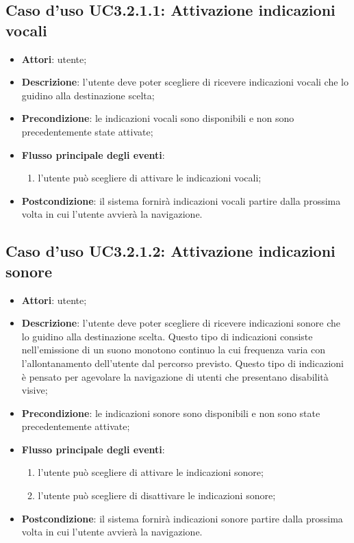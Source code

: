 \documentclass[../AnalisiDeiRequisiti.tex]{subfiles}
\begin{document}
\subsection{Caso d'uso UC3.2.1.1: Attivazione indicazioni vocali}
\begin{itemize}
\item \textbf{Attori}: utente;
\item \textbf{Descrizione}: l'utente deve poter scegliere di ricevere indicazioni vocali che lo guidino alla destinazione scelta; 
      \item \textbf{Precondizione}: le indicazioni vocali sono disponibili e non sono precedentemente state attivate;

        \item \textbf{Flusso principale degli eventi}:
          \begin{enumerate}
          \item l'utente può scegliere di attivare le indicazioni vocali;

      \end{enumerate}
    \item \textbf{Postcondizione}: il sistema fornirà indicazioni vocali partire dalla prossima volta in cui l'utente avvierà la navigazione.
  \end{itemize}
\hypertarget{UC3.2.1.2}{}
\subsection{Caso d'uso UC3.2.1.2: Attivazione indicazioni sonore}
\begin{itemize}
\item \textbf{Attori}: utente;
\item \textbf{Descrizione}: l'utente deve poter scegliere di ricevere indicazioni sonore che lo guidino alla destinazione scelta. Questo tipo di indicazioni consiste nell'emissione di un suono monotono continuo la cui frequenza varia con l'allontanamento dell'utente dal percorso previsto. Questo tipo di indicazioni è pensato per agevolare la navigazione di utenti che presentano disabilità visive; 
      \item \textbf{Precondizione}: le indicazioni sonore sono disponibili e non sono state precedentemente attivate;

        \item \textbf{Flusso principale degli eventi}:
          \begin{enumerate}
          \item l'utente può scegliere di attivare le indicazioni sonore;
          \item l'utente può scegliere di disattivare le indicazioni sonore;

      \end{enumerate}
    \item \textbf{Postcondizione}: il sistema fornirà indicazioni sonore partire dalla prossima volta in cui l'utente avvierà la navigazione.
  \end{itemize}
\hypertarget{UC3.2.1.3}{}
\end{document}
